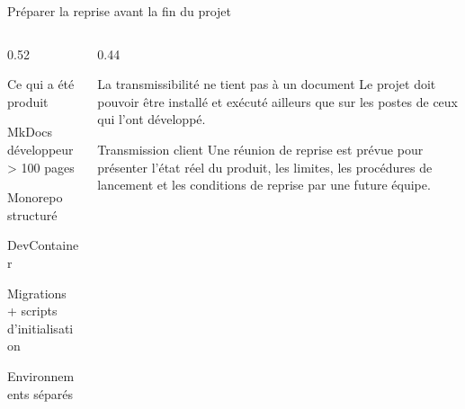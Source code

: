 \begin{frame}{Préparer la reprise avant la fin du projet}
\begin{columns}[T]
\begin{column}{0.52\linewidth}
\begin{block}{Ce qui a été produit}
\small
\begin{tightitems}
  \item MkDocs développeur > 100 pages
  \item Monorepo structuré
  \item DevContainer
  \item Migrations + scripts d'initialisation
  \item Environnements séparés
\end{tightitems}
\end{block}
\centering{}
\end{column}
\begin{column}{0.44\linewidth}
\begin{block}{La transmissibilité ne tient pas à un document}
\small Le projet doit pouvoir être installé et exécuté ailleurs que sur les postes de ceux qui l'ont développé.
\end{block}
\begin{block}{Transmission client}
\small Une réunion de reprise est prévue pour présenter l'état réel du produit, les limites, les procédures de lancement et les conditions de reprise par une future équipe.
\end{block}
\vspace{0.25em}
\scriptsize{}
\end{column}
\end{columns}
\end{frame}

